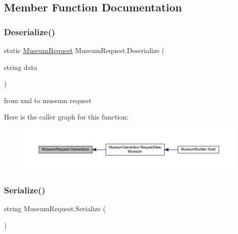 \subsection{Member Function Documentation}
\mbox{\label{class_museum_request_abd551a45744c8387841c20e5ef46d420}} 
\subsubsection{\texorpdfstring{Deserialize()}{Deserialize()}}
{\footnotesize\ttfamily static \mbox{\hyperlink{class_museum_request}{Museum\+Request}} Museum\+Request.\+Deserialize (\begin{DoxyParamCaption}\item[{string}]{data }\end{DoxyParamCaption})\hspace{0.3cm}{\ttfamily [static]}}



from xml to museum request 

Here is the caller graph for this function\+:
\nopagebreak
\begin{figure}[H]
\begin{center}
\leavevmode
\includegraphics[width=350pt]{class_museum_request_abd551a45744c8387841c20e5ef46d420_icgraph}
\end{center}
\end{figure}
\mbox{\label{class_museum_request_ae227bce4871f20bf6661db4a5af5fe1c}} 
\subsubsection{\texorpdfstring{Serialize()}{Serialize()}}
{\footnotesize\ttfamily string Museum\+Request.\+Serialize (\begin{DoxyParamCaption}{ }\end{DoxyParamCaption})}



